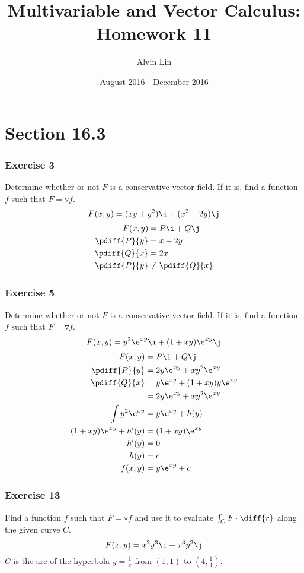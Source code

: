 \documentclass{math}
\title{Multivariable and Vector Calculus: Homework 11}
\author{Alvin Lin}
\date{August 2016 - December 2016}
\begin{document}
\maketitle

\section*{Section 16.3}

\subsubsection*{Exercise 3}
Determine whether or not \( F \) is a conservative vector field. If it is, find
a function \( f \) such that \( F = \triangledown f \).
\[ F(x,y) = (xy+y^2)\i+(x^2+2y)\j \]
\begin{align*}
  F(x,y) &= P\i+Q\j \\
  \pdiff{P}{y} &= x+2y \\
  \pdiff{Q}{x} &= 2x \\
  \pdiff{P}{y} &\ne \pdiff{Q}{x}
\end{align*}

\subsubsection*{Exercise 5}
Determine whether or not \( F \) is a conservative vector field. If it is, find
a function \( f \) such that \( F = \triangledown f \).
\[ F(x,y) = y^2\e^{xy}\i+(1+xy)\e^{xy}\j \]
\begin{align*}
  F(x,y) &= P\i+Q\j \\
  \pdiff{P}{y} &= 2y\e^{xy}+xy^2\e^{xy} \\
  \pdiff{Q}{x} &= y\e^{xy}+(1+xy)y\e^{xy} \\
  &= 2y\e^{xy}+xy^2\e^{xy} \\
  \int y^2\e^{xy} &= y\e^{xy}+h(y) \\
  (1+xy)\e^{xy}+h'(y) &= (1+xy)\e^{xy} \\
  h'(y) &= 0 \\
  h(y) &= c \\
  f(x,y) &= y\e^{xy}+c
\end{align*}

\subsubsection*{Exercise 13}
Find a function \( f \) such that \( F = \triangledown f \) and use it to
evaluate \( \int_{C}F\cdot\diff{r} \) along the given curve \( C \).
\[ F(x,y) = x^2y^3\i+x^3y^2\j \]
\( C \) is the arc of the hyperbola \( y = \frac{1}{x} \) from \( (1,1) \) to
\( (4,\frac{1}{4}) \).
\end{document}
